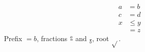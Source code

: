 \documentclass{article}
\begin{document}
\begin{align}
a &= b \\
c &= d
\end{align}
\[\begin{aligned} x &\le y \\ &= z \end{aligned}\]
Prefix $=b$, fractions $\frac{a}{}$ and $\frac{}{b}$, root $\sqrt{}$.
\end{document}
